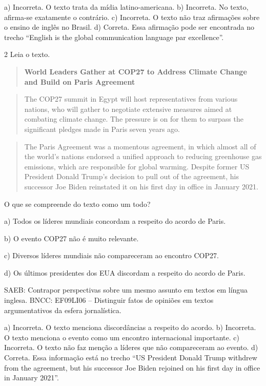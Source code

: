 a) Incorreta. O texto trata da mídia latino-americana. b) Incorreta. No
texto, afirma-se exatamente o contrário. c) Incorreta. O texto não traz
afirmações sobre o ensino de inglês no Brasil. d) Correta. Essa
afirmação pode ser encontrada no trecho ``English is the global
communication language par excellence''.

\num{2} Leia o texto.

\begin{quote}
\textbf{World Leaders Gather at COP27 to Address Climate Change and
Build on Paris Agreement}
\end{quote}

\begin{quote}
The COP27 summit in Egypt will host representatives from various
nations, who will gather to negotiate extensive measures aimed at
combating climate change. The pressure is on for them to surpass the
significant pledges made in Paris seven years ago.
\end{quote}

\begin{quote}
The Paris Agreement was a momentous agreement, in which almost all of
the world's nations endorsed a unified approach to reducing greenhouse
gas emissions, which are responsible for global warming. Despite former
US President Donald Trump's decision to pull out of the agreement, his
successor Joe Biden reinstated it on his first day in office in January
2021.
\end{quote}


O que se compreende do texto como um todo?

a) Todos os líderes mundiais concordam a respeito do acordo de Paris.

b) O evento COP27 não é muito relevante.

c) Diversos líderes mundiais não compareceram ao encontro COP27.

d) Os últimos presidentes dos EUA discordam a respeito do acordo de
Paris.

SAEB: Contrapor perspectivas sobre um mesmo assunto em textos em língua
inglesa. BNCC: EF09LI06 -- Distinguir fatos de opiniões em textos
argumentativos da esfera jornalística.

a) Incorreta. O texto menciona discordâncias a respeito do acordo. b)
Incorreta. O texto menciona o evento como um encontro internacional
importante. c) Incorreta. O texto não faz menção a líderes que não
compareceram ao evento. d) Correta. Essa informação está no trecho ``US
President Donald Trump withdrew from the agreement, but his successor
Joe Biden rejoined on his first day in office in January 2021''.

